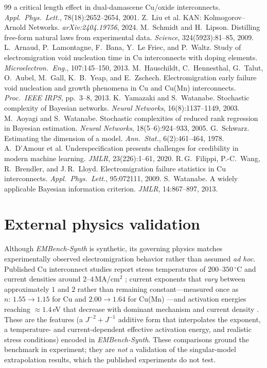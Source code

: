 \documentclass{article}
\begin{document}
\begin{thebibliography}{99}
a critical length effect in dual-damascene Cu/oxide interconnects.
\textit{Appl.\ Phys.\ Lett.}, 78(18):2652--2654, 2001.
 Z.~Liu et al. KAN: Kolmogorov--Arnold
Networks. \textit{arXiv:2404.19756}, 2024.
 M.~Schmidt and H.~Lipson. Distilling
free-form natural laws from experimental data. \textit{Science},
324(5923):81--85, 2009.
 L.~Arnaud, P.~Lamontagne, F.~Bana,
Y.~Le Friec, and P.~Waltz. Study of electromigration void nucleation time in
Cu interconnects with doping elements. \textit{Microelectron.\ Eng.},
107:145--150, 2013.
 M.~Hauschildt, C.~Hennesthal, G.~Talut,
O.~Aubel, M.~Gall, K.~B.~Yeap, and E.~Zschech. Electromigration early failure
void nucleation and growth phenomena in Cu and Cu(Mn) interconnects.
\textit{Proc.\ IEEE IRPS}, pp.~3--8, 2013.
 K.~Yamazaki and S.~Watanabe.
Stochastic complexity of Bayesian networks. \textit{Neural Networks},
16(8):1137--1149, 2003.
 M.~Aoyagi and S.~Watanabe.
Stochastic complexities of reduced rank regression in Bayesian estimation.
\textit{Neural Networks}, 18(5--6):924--933, 2005.
 G.~Schwarz. Estimating the dimension of a
model. \textit{Ann.\ Stat.}, 6(2):461--464, 1978.
 A.~D'Amour et al. Underspecification
presents challenges for credibility in modern machine learning. \textit{JMLR},
23(226):1--61, 2020.
 R.\,G.~Filippi, P.-C.~Wang,
R.~Brendler, and J.\,R.~Lloyd. Electromigration failure statistics in
Cu interconnects. \textit{Appl.\ Phys.\ Lett.}, 95:072111, 2009.
 S.~Watanabe. A widely applicable Bayesian
information criterion. \textit{JMLR}, 14:867--897, 2013.
\end{thebibliography}

\appendix
\section*{External physics validation}
Although \emph{EMBench-Synth} is synthetic, its governing physics matches
experimentally observed electromigration behavior rather than assumed
\emph{ad hoc}. Published Cu interconnect studies report stress temperatures of
$200$--$350\,^\circ$C and current densities around $2$--$4$\,MA/cm$^2$
\citep{arnaud2013}; current exponents that \emph{vary} between approximately
$1$ and $2$ rather than remaining constant---measured once as
$n{:}\,1.55\to1.15$ for Cu and $2.00\to1.64$ for Cu(Mn) \citep{gall2013}---and
activation energies reaching $\approx1.4$\,eV that decrease with dominant
mechanism and current density \citep{arnaud2013,gall2013}. These are the
features (a $J^{-2}+J^{-1}$ additive form that interpolates the exponent, a
temperature- and current-dependent effective activation energy, and realistic
stress conditions) encoded in \emph{EMBench-Synth}. These comparisons ground
the benchmark in experiment; they are \emph{not} a validation of the
singular-model extrapolation results, which the published experiments do not
test.
\end{document}

